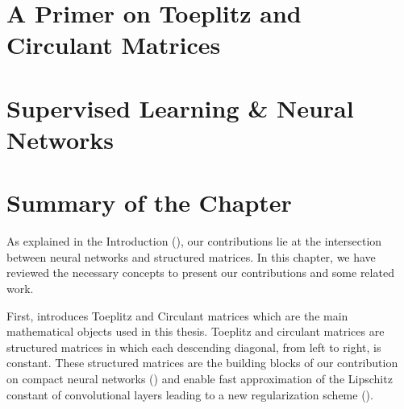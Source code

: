 \section{A Primer on Toeplitz and Circulant Matrices}
\label{section:ch2-a_primer_on_toeplitz_and_circulant_matrices}



\section{Supervised Learning \& Neural Networks}
\label{section:ch2-supervised_learning_neural_networks}



\section{Summary of the Chapter}
\label{section:ch2-summary_of_the_background}

As explained in the Introduction (), our contributions lie at the intersection between neural networks and structured matrices.
In this chapter, we have reviewed the necessary concepts to present our contributions and some related work.

First,  introduces Toeplitz and Circulant matrices which are the main mathematical objects used in this thesis.
Toeplitz and circulant matrices are structured matrices in which each descending diagonal, from left to right, is constant.
These structured matrices are the building blocks of our contribution on compact neural networks () and enable fast approximation of the Lipschitz constant of convolutional layers leading to a new regularization scheme ().

